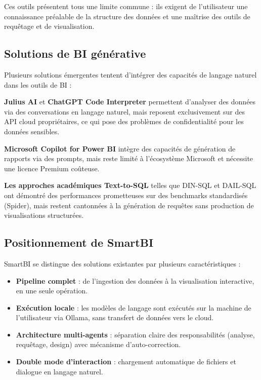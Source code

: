 Ces outils présentent tous une limite commune : ils exigent de l'utilisateur une connaissance préalable de la structure des données et une maîtrise des outils de requêtage et de visualisation.

\subsection{Solutions de BI générative}

Plusieurs solutions émergentes tentent d'intégrer des capacités de langage naturel dans les outils de BI :

\textbf{Julius AI} et \textbf{ChatGPT Code Interpreter} permettent d'analyser des données via des conversations en langage naturel, mais reposent exclusivement sur des API cloud propriétaires, ce qui pose des problèmes de confidentialité pour les données sensibles.

\textbf{Microsoft Copilot for Power BI} intègre des capacités de génération de rapports via des prompts, mais reste limité à l'écosystème Microsoft et nécessite une licence Premium coûteuse.

\textbf{Les approches académiques Text-to-SQL} telles que DIN-SQL et DAIL-SQL ont démontré des performances prometteuses sur des benchmarks standardisés (Spider), mais restent cantonnées à la génération de requêtes sans production de visualisations structurées.

\subsection{Positionnement de SmartBI}

SmartBI se distingue des solutions existantes par plusieurs caractéristiques :

\begin{itemize}[leftmargin=2cm]
    \item \textbf{Pipeline complet} : de l'ingestion des données à la visualisation interactive, en une seule opération.
    \item \textbf{Exécution locale} : les modèles de langage sont exécutés sur la machine de l'utilisateur via Ollama, sans transfert de données vers le cloud.
    \item \textbf{Architecture multi-agents} : séparation claire des responsabilités (analyse, requêtage, design) avec mécanisme d'auto-correction.
    \item \textbf{Double mode d'interaction} : chargement automatique de fichiers et dialogue en langage naturel.
\end{itemize}

